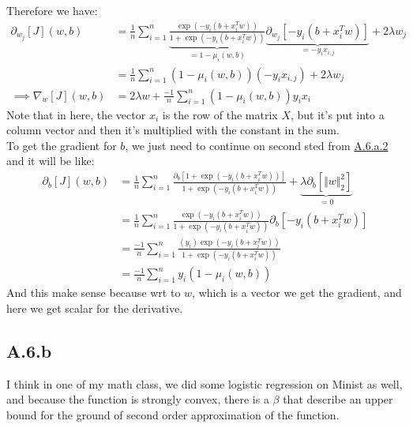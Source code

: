\documentclass[]{article}
\begin{document}
        Therefore we have: 
        \begin{align*}\tag{A.6.a.4}\label{eqn:A.6.a.4}
            \partial_{w_j}[J](w, b)
            &= 
            \frac{1}{n}\sum_{i  = 1}^{n}
                \underbrace{\frac{
                    \exp(-y_i(b + x_i^T w))
                }
                {
                    1 + \exp(-y_i(b + x_i^T w))
                }}_{= 1- \mu_i(w, b)}\underbrace{\partial_{w_j}[-y_i(b +x_i^Tw)]}_{= -y_ix_{i,j}}
                + 2\lambda w_j
            \\
            &= 
            \frac{1}{n}\sum_{i  = 1}^{n}
                (1- \mu_i(w, b))(-y_i x_{i, j})
                + 2\lambda w_j
            \\
            \implies \nabla_w[J](w, b) &= 2\lambda w + \frac{-1}{n}\sum_{i = 1}^{n}
                (1 - \mu_i(w, b))y_ix_i
        \end{align*}
        Note that in here, the vector $x_i$ is the row of the matrix $X$, but it's put into a column vector and then it's multiplied with the constant in the sum. 
        \\
        To get the gradient for $b$, we just need to continue on second sted from \hyperref[eqn:A.6.a.2]{A.6.a.2} and it will be like: 
        \begin{align*}\tag{A.6.a.5}\label{eqn:A.6.a.5}
            \partial_{b}[J](w, b)
            &= 
            \frac{1}{n}\sum_{i  = 1}^{n}
                \frac{
                    \partial_{b}[1 + \exp(-y_i(b + x_i^T w))]
                }
                {
                    1 + \exp(-y_i(b + x_i^T w))
                }
                +
                \underbrace{\lambda\partial_{b}[\Vert w\Vert_2^2]}_{ = 0}
            \\
            &= 
            \frac{1}{n}\sum_{i  = 1}^{n}
                \frac{
                    \exp(-y_i(b + x_i^T w))
                }
                {
                    1 + \exp(-y_i(b + x_i^T w))
                }
                \partial_{b}[-y_i(b + x_i^Tw)]
            \\
            &=
            \frac{-1}{n}\sum_{i  = 1}^{n}
                \frac{
                    (y_i)\exp(-y_i(b + x_i^T w))
                }
                {
                    1 + \exp(-y_i(b + x_i^T w))
                }
            \\
            &=
            \frac{-1}{n}\sum_{i  = 1}^{n}
                y_i(1 - \mu_i(w, b))
        \end{align*}
        And this make sense because wrt to $w$, which is a vector we get the gradient, and here we get scalar for the derivative. 
    \subsection*{A.6.b}
        I think in one of my math class, we did some logistic regression on Minist as well, and because the function is strongly convex, there is a $\beta$ that describe an upper bound for the ground of second order approximation of the function. 
\end{document}
